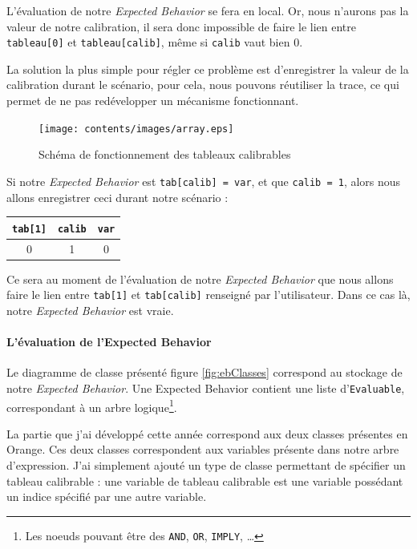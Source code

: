 L'évaluation de notre \textit{Expected Behavior} se fera en local. Or, nous n'aurons pas la valeur de notre calibration, il sera donc impossible de faire le lien entre \texttt{tableau[0]} et \texttt{tableau[calib]}, même si \texttt{calib} vaut bien 0.

La solution la plus simple pour régler ce problème est d'enregistrer la valeur de la calibration durant le scénario, pour cela, nous pouvons réutiliser la trace, ce qui permet de ne pas redévelopper un mécanisme fonctionnant. 
\begin{figure}[H]
\centering
\texttt{[image: contents/images/array.eps]}
\caption{Schéma de fonctionnement des tableaux calibrables}
\label{fig:array}
\end{figure}

\begin{exemple}
Si notre \textit{Expected Behavior} est \texttt{tab[calib] = var}, et que \texttt{calib = 1}, alors nous allons enregistrer ceci durant notre scénario : 

\begin{tabular}{ccc}
\texttt{tab[1]} & \texttt{calib} & \texttt{var}\\
\hline
0      &   1   & 0
\end{tabular}

Ce sera au moment de l'évaluation de notre \textit{Expected Behavior} que nous allons faire le lien entre \texttt{tab[1]} et \texttt{tab[calib]} renseigné par l'utilisateur. Dans ce cas là, notre \textit{Expected Behavior} est vraie.
\end{exemple}

\paragraph{L'évaluation de l'Expected Behavior}

Le diagramme de classe présenté figure \ref{fig:ebClasses} correspond au stockage de notre \textit{Expected Behavior}. Une Expected Behavior contient une liste d'\texttt{Evaluable}, correspondant à un arbre logique\footnote{Les noeuds pouvant être des \texttt{AND}, \texttt{OR}, \texttt{IMPLY}, \ldots}. 

La partie que j'ai développé cette année correspond aux deux classes présentes en Orange. Ces deux classes correspondent aux variables présente dans notre arbre d'expression. J'ai simplement ajouté un type de classe permettant de spécifier un tableau calibrable : une variable de tableau calibrable est une variable possédant un indice spécifié par une autre variable.

